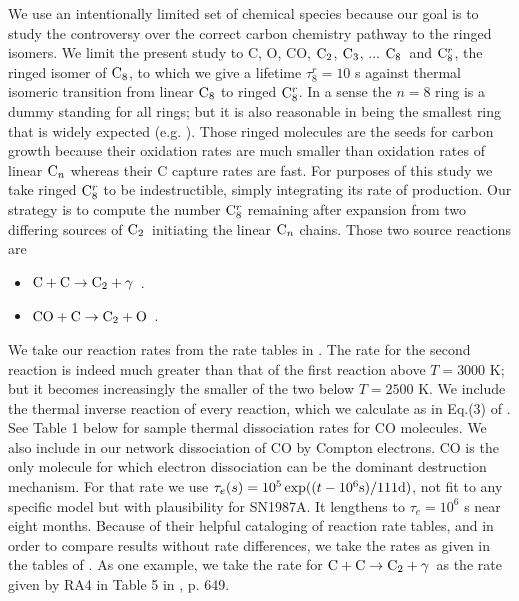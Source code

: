 \documentclass[manuscript]{aastex}
\newcommand{\ctwo}{{\rm C}_2}
\newcommand{\cthree}{{\rm C}_3}
\newcommand{\ceight}{{\rm C}_8}
\newcommand{\ceightr}{{\rm C}_8^r}
\newcommand{\cenn}{{\rm C}_n}
\newcommand{\twoctoctwo}{${\rm C} + {\rm C} \to \ctwo + \gamma$}
\newcommand{\coctoctwo}{${\rm CO} + {\rm C} \to \ctwo + {\rm O}$}
\begin{document}
\begin{CJK*}{UTF8}{gbsn}
We use an intentionally limited set of chemical species because our goal is
to study the controversy over the correct 
carbon chemistry pathway to the ringed isomers.
We limit the present study to C, O, CO, $\ctwo$, $\cthree$, ... $\ceight$\ and
$\ceightr$, the ringed isomer of $\ceight$, to which we give a lifetime
$\tau_8^r = 10$ s against thermal isomeric transition
from linear $\ceight$ to ringed $\ceightr$.
In a sense the $n = 8$ ring is a dummy standing for all rings; but it is also
reasonable in being the smallest ring that is widely expected 
(e.g. \citealt{doi:10.1021/j100374a025}).
Those ringed molecules are the seeds for carbon
growth because their oxidation rates are much smaller than oxidation rates of
linear $\cenn$
whereas their C capture rates are fast. 
For purposes of this study we take ringed $\ceightr$ to be
indestructible, simply integrating its rate of production.
Our strategy is
to compute the number $\ceightr$ remaining after expansion from two differing
sources of $\ctwo$\ initiating the linear $\cenn$
chains. Those two source reactions are
\begin{itemize}
\item \twoctoctwo\ \citep{1999Sci...283.1290C}.
\item \coctoctwo\ \citep{2009ApJ...703..642C,2010ApJ...713....1C}.
\end{itemize}
We take our reaction rates from the rate tables in
\citet{2009ApJ...703..642C,2010ApJ...713....1C}.
The rate for the second reaction is indeed
much greater than that of the first reaction above $T=3000$ K;
but it becomes increasingly the smaller of the two below $T=2500$ K.
We include the thermal inverse reaction of every reaction,
which we calculate as in Eq.(3) of \citet{2001ApJ...562..480C}.
See Table 1 below for sample thermal dissociation rates for CO molecules.
We also include in our network dissociation of CO by Compton electrons.
CO is the only molecule for which electron dissociation can be the dominant
destruction mechanism. For that rate we use
$\tau_e (s) = 10^5 \exp( (t-10^6{\rm s}) / 111 {\rm d} )$,
not fit to any specific model but with plausibility for SN1987A.
It lengthens to $\tau_e = 10^6$ s near eight months.
Because of their helpful cataloging of reaction rate tables,
and in order to compare results without rate differences, we take the
rates as given in the tables of
\citet{2009ApJ...703..642C,2010ApJ...713....1C}.
As one example, we take the rate for \twoctoctwo\
as the rate given by RA4 in Table 5 in \citet{2009ApJ...703..642C}, p. 649.


\end{CJK*}
\end{document}
